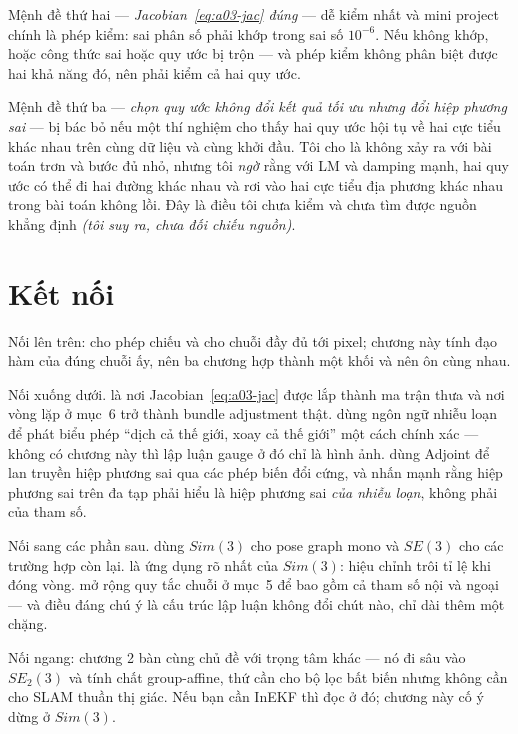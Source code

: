 \documentclass[../../vslam.tex]{subfiles}
\begin{document}
Mệnh đề thứ hai --- \emph{Jacobian~\eqref{eq:a03-jac} đúng} --- dễ kiểm nhất và mini project chính là phép kiểm: sai phân số phải khớp trong sai số \(10^{-6}\). Nếu không khớp, hoặc công thức sai hoặc quy ước bị trộn --- và phép kiểm không phân biệt được hai khả năng đó, nên phải kiểm cả hai quy ước.

Mệnh đề thứ ba --- \emph{chọn quy ước không đổi kết quả tối ưu nhưng đổi hiệp phương sai} --- bị bác bỏ nếu một thí nghiệm cho thấy hai quy ước hội tụ về hai cực tiểu khác nhau trên cùng dữ liệu và cùng khởi đầu. Tôi cho là không xảy ra với bài toán trơn và bước đủ nhỏ, nhưng tôi \emph{ngờ} rằng với LM và damping mạnh, hai quy ước có thể đi hai đường khác nhau và rơi vào hai cực tiểu địa phương khác nhau trong bài toán không lồi. Đây là điều tôi chưa kiểm và chưa tìm được nguồn khẳng định \emph{(tôi suy ra, chưa đối chiếu nguồn)}.

\section{Kết nối}

Nối lên trên:  cho phép chiếu và  cho chuỗi đầy đủ tới pixel; chương này tính đạo hàm của đúng chuỗi ấy, nên ba chương hợp thành một khối và nên ôn cùng nhau.

Nối xuống dưới.  là nơi Jacobian~\eqref{eq:a03-jac} được lắp thành ma trận thưa và nơi vòng lặp ở mục~6 trở thành bundle adjustment thật.  dùng ngôn ngữ nhiễu loạn để phát biểu phép ``dịch cả thế giới, xoay cả thế giới'' một cách chính xác --- không có chương này thì lập luận gauge ở đó chỉ là hình ảnh.  dùng Adjoint để lan truyền hiệp phương sai qua các phép biến đổi cứng, và nhấn mạnh rằng hiệp phương sai trên đa tạp phải hiểu là hiệp phương sai \emph{của nhiễu loạn}, không phải của tham số.

Nối sang các phần sau.  dùng \(Sim(3)\) cho pose graph mono và \(SE(3)\) cho các trường hợp còn lại.  là ứng dụng rõ nhất của \(Sim(3)\): hiệu chỉnh trôi tỉ lệ khi đóng vòng.  mở rộng quy tắc chuỗi ở mục~5 để bao gồm cả tham số nội và ngoại --- và điều đáng chú ý là cấu trúc lập luận không đổi chút nào, chỉ dài thêm một chặng.

Nối ngang:  chương 2 bàn cùng chủ đề với trọng tâm khác --- nó đi sâu vào \(SE_2(3)\) và tính chất group-affine, thứ cần cho bộ lọc bất biến nhưng không cần cho SLAM thuần thị giác. Nếu bạn cần InEKF thì đọc ở đó; chương này cố ý dừng ở \(Sim(3)\).
\end{document}
